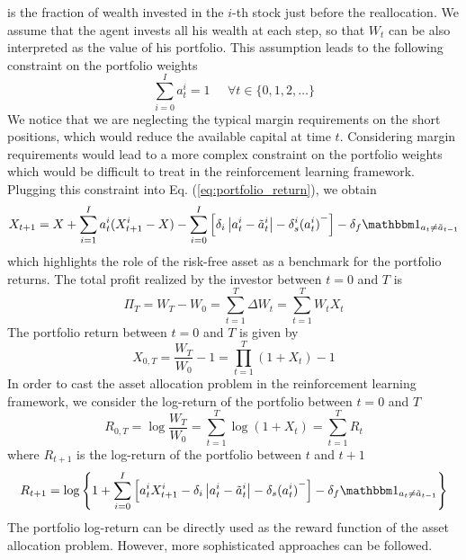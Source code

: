is the fraction of wealth invested in the $i$-th stock just before the 
reallocation. We assume that the agent invests all his wealth at each step, so 
that $W_t$ can be also interpreted as the value of his portfolio. This 
assumption leads to the following constraint on the portfolio weights
\begin{equation}
	\sum^{I}_{i=0} a_t^i = 1 \;\;\;\;\; \forall t \in \{0, 1, 2, \ldots\}
\end{equation}
We notice that we are neglecting the typical margin requirements on the short
positions, which would reduce the available capital at time $t$. Considering
margin requirements would lead to a more complex constraint on the portfolio
weights which would be difficult to treat in the reinforcement learning
framework. Plugging this constraint into Eq. (\ref{eq:portfolio_return}), we
obtain
\begin{equation}\label{eq:portfolio_return_benchmark}
	X_{t+1} = X + \sum^{I}_{i=1} a_t^i (X_{t+1}^i - X) - \sum^{I}_{i=0}
	\left[\delta_i \left| a_t^i - \tilde{a}_t^i \right| - \delta_s^i
	{(a_t^i)}^-\right] - \delta_f \ind{{a}_t \neq \tilde{{a}}_{t-1}}   
\end{equation}
which highlights the role of the risk-free asset as a benchmark for the 
portfolio returns. The total profit realized by the investor between $t=0$ and
$T$ is 
\begin{equation*}
	\Pi_T = W_T - W_0 = \sum^{T}_{t=1} \Delta W_t = \sum^{T}_{t=1} W_t X_t  
\end{equation*}
The portfolio return between $t=0$ and $T$ is given by
\begin{equation*}
	X_{0,T} = \frac{W_T}{W_0} - 1 = \prod_{t=1}^T (1+X_t) - 1
\end{equation*}
In order to cast the asset allocation problem in the reinforcement learning
framework, we consider the log-return of the portfolio between $t=0$ and $T$
\begin{equation}
	R_{0,T} = \log \frac{W_T}{W_0} = \sum^{T}_{t=1} \log(1+X_t) = \sum_{t=1}^T
	R_t
\end{equation}
where $R_{t+1}$ is the log-return of the portfolio between $t$ and $t+1$
\begin{equation}
	\label{eq:portfolio_daily_logreturn}
	R_{t+1} = \log \left\{ 1 + \sum^{I}_{i=0} \left[ a_t^i X_{t+1}^i - \delta_i
	\left| a_t^i - \tilde{a}_t^i \right| - \delta_s {(a_t^i)}^- \right] -
	\delta_f \ind{{a}_t \neq \tilde{{a}}_{t-1}}\right\}
\end{equation}
The portfolio log-return can be directly used as the reward function of the asset allocation problem. However, more sophisticated approaches can be followed.


